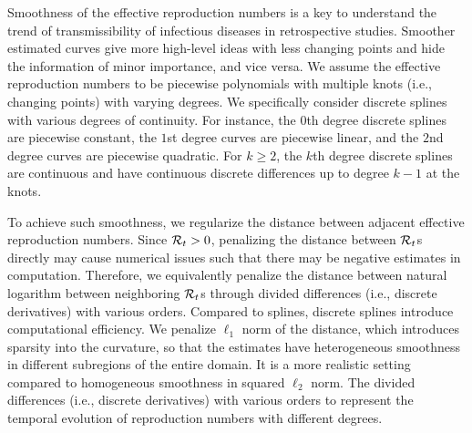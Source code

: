 Smoothness of the effective reproduction numbers is a key to understand the trend of transmissibility of infectious diseases in retrospective studies. Smoother estimated curves give more high-level ideas with less changing points and hide the information of minor importance, and vice versa. 
We assume the effective reproduction numbers to be piecewise polynomials with multiple knots (i.e., changing points) with varying degrees. We specifically consider discrete splines with various degrees of continuity. For instance, the $0$th degree discrete splines are piecewise constant, the $1$st degree curves are piecewise linear, and the $2$nd degree curves are piecewise quadratic. For $k\geq 2$, the $k$th degree discrete splines are continuous and have continuous discrete differences up to degree $k-1$ at the knots. 

To achieve such smoothness, we regularize the distance between adjacent effective reproduction numbers. Since $\mathcal{R}_t > 0$, penalizing the distance between $\mathcal{R}_t$s directly may cause numerical issues such that there may be negative estimates in computation. Therefore, we equivalently penalize the distance between natural logarithm between neighboring $\mathcal{R}_t$s through divided differences (i.e., discrete derivatives) with various orders.  
Compared to splines, discrete splines introduce computational efficiency. 
We penalize $\ell_1$ norm of the distance, which introduces sparsity into the curvature, so that the estimates have heterogeneous smoothness in different subregions of the entire domain. It is a more realistic setting compared to homogeneous smoothness in squared $\ell_2$ norm. 
The divided differences (i.e., discrete derivatives) with various orders to represent the temporal evolution of reproduction numbers with different degrees. 

